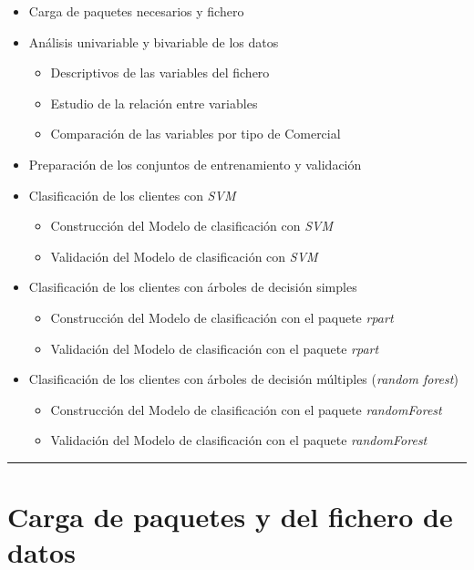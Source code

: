 \documentclass[]{article}
\begin{document}
\begin{itemize}
\item
  Carga de paquetes necesarios y fichero
\item
  Análisis univariable y bivariable de los datos

  \begin{itemize}
  \item
    Descriptivos de las variables del fichero
  \item
    Estudio de la relación entre variables
  \item
    Comparación de las variables por tipo de Comercial
  \end{itemize}
\item
  Preparación de los conjuntos de entrenamiento y validación
\item
  Clasificación de los clientes con \emph{SVM}

  \begin{itemize}
  \item
    Construcción del Modelo de clasificación con \emph{SVM}
  \item
    Validación del Modelo de clasificación con \emph{SVM}
  \end{itemize}
\item
  Clasificación de los clientes con árboles de decisión simples

  \begin{itemize}
  \item
    Construcción del Modelo de clasificación con el paquete \emph{rpart}
  \item
    Validación del Modelo de clasificación con el paquete \emph{rpart}
  \end{itemize}
\item
  Clasificación de los clientes con árboles de decisión múltiples
  (\emph{random forest})

  \begin{itemize}
  \item
    Construcción del Modelo de clasificación con el paquete
    \emph{randomForest}
  \item
    Validación del Modelo de clasificación con el paquete
    \emph{randomForest}
  \end{itemize}
\end{itemize}

\begin{center}\rule{0.5\linewidth}{\linethickness}\end{center}

\section{Carga de paquetes y del fichero de
datos}\label{carga-de-paquetes-y-del-fichero-de-datos}
\end{document}
